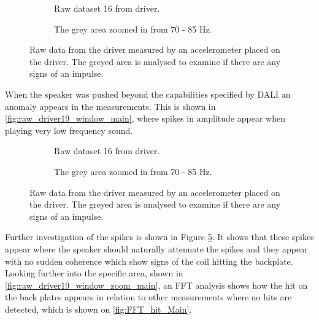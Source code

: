\begin{figure}[H]
\centering
\begin{subfigure}[t]{0.55\textwidth}
	
	\caption{Raw dataset 16 from driver.}
	\label{fig:Driver1Report}
\end{subfigure}
\begin{subfigure}[t]{0.43\textwidth}
	
	\caption{The grey area zoomed in from 70 - 85 Hz.}
	\label{fig:Enclosure1Report}
\end{subfigure}
\caption{Raw data from the driver measured by an accelerometer placed on the driver. The greyed area is analysed to examine if there are any signs of an impulse.}
\label{fig:dataset1}
\end{figure}

When the speaker was pushed beyond the capabilities specified by DALI an anomaly appears in the measurements. This is shown in \autoref{fig:raw_driver19_window_main}, where spikes in amplitude appear when playing very low frequency sound. 

\begin{figure}[H]
\centering
\begin{subfigure}[t]{0.55\textwidth}
	
	\caption{Raw dataset 16 from driver.}
	\label{fig:raw_driver19_window_main}
\end{subfigure}
\begin{subfigure}[t]{0.43\textwidth}
	
	\caption{The grey area zoomed in from 70 - 85 Hz.}
	\label{fig:raw_driver19_window_zoom_main}
\end{subfigure}
\caption{Raw data from the driver measured by an accelerometer placed on the driver. The greyed area is analysed to examine if there are any signs of an impulse.}
\label{fig:raw_driver19_windows_main}
\end{figure}

Further investigation of the spikes is shown in Figure \ref{fig:raw_driver19_window_zoom_main}. It shows that these spikes appear where the speaker should naturally attenuate the spikes and they appear with no sudden coherence which show signs of the coil hitting the backplate. Looking further into the specific area, shown in \autoref{fig:raw_driver19_window_zoom_main}, an FFT analysis shows how the hit on the back plates appears in relation to other measurements where no hits are detected, which is shown on \autoref{fig:FFT_hit_Main}.

